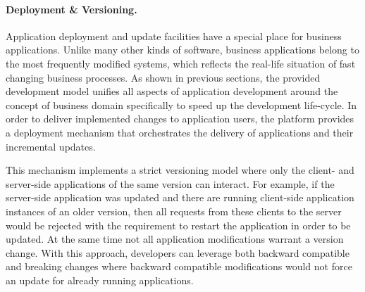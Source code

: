   \paragraph{Deployment \& Versioning.}
  Application deployment and update facilities have a special place for business applications.
  Unlike many other kinds of software, business applications belong to the most frequently modified systems, which reflects the real-life situation of fast changing business processes.
  As shown in previous sections, the provided development model unifies all aspects of application development around the concept of business domain specifically to speed up the development life-cycle.
  In order to deliver implemented changes to application users, the platform provides a deployment mechanism that orchestrates the delivery of applications and their incremental updates.
  
  This mechanism implements a strict versioning model where only the client- and server-side applications of the same version can interact.
  For example, if the server-side application was updated and there are running client-side application instances of an older version, then all requests from these clients to the server would be rejected with the requirement to restart the application in order to be updated.
  At the same time not all application modifications warrant a version change.
  With this approach, developers can leverage both backward compatible and breaking changes where backward compatible modifications would not force an update for already running applications.
  